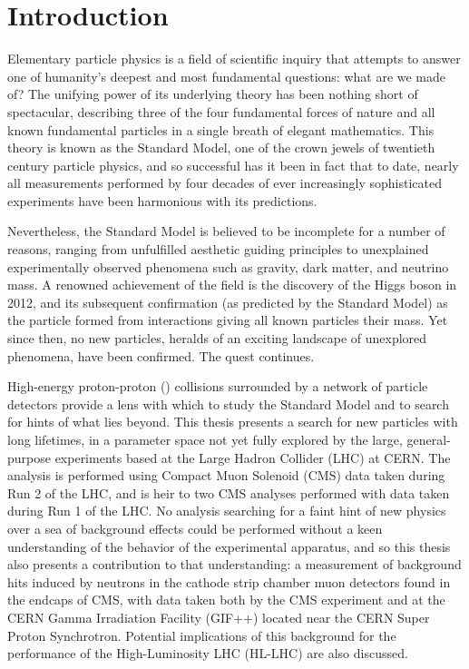 \chapter{Introduction}

Elementary particle physics is a field of scientific inquiry that attempts to answer one of humanity's deepest and most fundamental questions: what are we made of?
The unifying power of its underlying theory has been nothing short of spectacular, describing three of the four fundamental forces of nature and all known fundamental particles in a single breath of elegant mathematics.
This theory is known as the Standard Model, one of the crown jewels of twentieth century particle physics, and so successful has it been in fact that to date, nearly all measurements performed by four decades of ever increasingly sophisticated experiments have been harmonious with its predictions.

Nevertheless, the Standard Model is believed to be incomplete for a number of reasons, ranging from unfulfilled aesthetic guiding principles to unexplained experimentally observed phenomena such as gravity, dark matter, and neutrino mass.
A renowned achievement of the field is the discovery of the Higgs boson in 2012, and its subsequent confirmation (as predicted by the Standard Model) as the particle formed from interactions giving all known particles their mass.
Yet since then, no new particles, heralds of an exciting landscape of unexplored phenomena, have been confirmed.
The quest continues.

High-energy proton-proton (\pp) collisions surrounded by a network of particle detectors provide a lens with which to study the Standard Model and to search for hints of what lies beyond.
This thesis presents a search for new particles with long lifetimes, in a parameter space not yet fully explored by the large, general-purpose experiments based at the Large Hadron Collider (LHC) at CERN.
The analysis is performed using Compact Muon Solenoid (CMS) data taken during Run 2 of the LHC, and is heir to two CMS analyses \cite{EXO-12-037,CMS-PAS-EXO-14-012} performed with data taken during Run 1 of the LHC.
No analysis searching for a faint hint of new physics over a sea of background effects could be performed without a keen understanding of the behavior of the experimental apparatus, and so this thesis also presents a contribution to that understanding: a measurement of background hits induced by neutrons in the cathode strip chamber muon detectors found in the endcaps of CMS, with data taken both by the CMS experiment and at the CERN Gamma Irradiation Facility (GIF++) located near the CERN Super Proton Synchrotron.
Potential implications of this background for the performance of the High-Luminosity LHC (HL-LHC) are also discussed.

